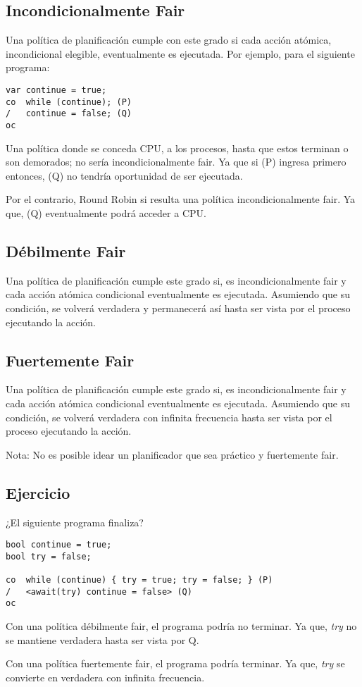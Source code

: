 \documentclass[a4paper, 10pt]{report}
\begin{document}
\subsection{Incondicionalmente Fair}

Una política de planificación cumple con este grado si cada acción atómica, incondicional elegible, eventualmente es ejecutada. Por ejemplo, para el siguiente programa:

\begin{lstlisting}
var continue = true;
co  while (continue); (P)
/   continue = false; (Q)
oc
\end{lstlisting}


Una política donde se conceda CPU, a los procesos, hasta que estos terminan o son demorados; no sería incondicionalmente fair. Ya que si (P) ingresa primero entonces, (Q) no tendría oportunidad de ser ejecutada.

Por el contrario, Round Robin si resulta una política incondicionalmente fair. Ya que, (Q) eventualmente podrá acceder a CPU.

\subsection{Débilmente Fair}

Una política de planificación cumple este grado si, es incondicionalmente fair y cada acción atómica condicional eventualmente es ejecutada. Asumiendo que su condición, se volverá verdadera y permanecerá así hasta ser vista por el proceso ejecutando la acción.

\subsection{Fuertemente Fair}

Una política de planificación cumple este grado si, es incondicionalmente fair y cada acción atómica condicional eventualmente es ejecutada. Asumiendo que su condición, se volverá verdadera con infinita frecuencia hasta ser vista por el proceso ejecutando la acción.

Nota: No es posible idear un planificador que sea práctico y fuertemente fair.

\subsection{Ejercicio}

¿El siguiente programa finaliza?

\begin{lstlisting}
bool continue = true;
bool try = false;

co  while (continue) { try = true; try = false; } (P)
/   <await(try) continue = false> (Q)
oc
\end{lstlisting}

Con una política débilmente fair, el programa podría no terminar. Ya que, \emph{try} no se mantiene verdadera hasta ser vista por Q.

Con una política fuertemente fair, el programa podría terminar. Ya que, \emph{try} se convierte en verdadera con infinita frecuencia.
\end{document}
